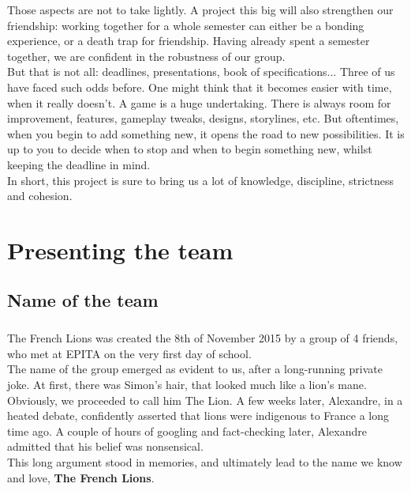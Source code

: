 Those aspects are not to take lightly. A project this big will also strengthen our friendship: working together for a whole semester can either be a bonding experience, or a death trap for friendship. Having already spent a semester together, we are confident in the robustness of our group.\\


But that is not all: deadlines, presentations, book of specifications... Three of us have faced such odds before. One might think that it becomes easier with time, when it really doesn’t. A game is a huge undertaking. There is always room for improvement, features, gameplay tweaks, designs, storylines, etc. But oftentimes, when you begin to add something new, it opens the road to new possibilities. It is up to you to decide when to stop and when to begin something new, whilst keeping the deadline in mind.\\

In short, this project is sure to bring us a lot of knowledge, discipline, strictness and cohesion.

\chapter{Presenting the team}

\section{Name of the team}

\paragraph{}The French Lions was created the 8th of November 2015 by a group of 4 friends, who met at EPITA on the very first day of school.\\

The name of the group emerged as evident to us, after a long-running private joke. At first, there was Simon’s hair, that looked much like a lion’s mane. Obviously, we proceeded to call him The Lion. A few weeks later, Alexandre, in a heated debate, confidently asserted that lions were indigenous to France a long time ago. A couple of hours of googling and fact-checking later, Alexandre admitted that his belief was nonsensical.\\

This long argument stood in memories, and ultimately lead to the name we know and love, \textbf{The French Lions}.
\clearpage

